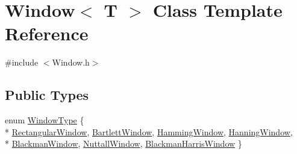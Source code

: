 \hypertarget{class_window}{}\section{Window$<$ T $>$ Class Template Reference}
\label{class_window}


{\ttfamily \#include $<$Window.\+h$>$}

\subsection*{Public Types}
\begin{DoxyCompactItemize}
\item 
enum \hyperlink{class_window_af334e9ffc511fb6b24db90a1a5c56007}{Window\+Type} \{ \\*
\hyperlink{class_window_af334e9ffc511fb6b24db90a1a5c56007a968d92993565f14bff698f96724d056f}{Rectangular\+Window}, 
\hyperlink{class_window_af334e9ffc511fb6b24db90a1a5c56007a5a263cbd5a29305d2029d3c81137f7be}{Bartlett\+Window}, 
\hyperlink{class_window_af334e9ffc511fb6b24db90a1a5c56007a96b8a8e50186f6e083a29e9f1dd5b200}{Hamming\+Window}, 
\hyperlink{class_window_af334e9ffc511fb6b24db90a1a5c56007a73c369fb0d9b77f7d1a53c60fac89f22}{Hanning\+Window}, 
\\*
\hyperlink{class_window_af334e9ffc511fb6b24db90a1a5c56007af4a4c6e29ac1173b0fc0e843208da0ee}{Blackman\+Window}, 
\hyperlink{class_window_af334e9ffc511fb6b24db90a1a5c56007a2f575ac3889682fbfd78ea1129875d38}{Nuttall\+Window}, 
\hyperlink{class_window_af334e9ffc511fb6b24db90a1a5c56007a02cfa6c9573b4e30ca607f8bb712ccf2}{Blackman\+Harris\+Window}
 \}
\end{DoxyCompactItemize}

